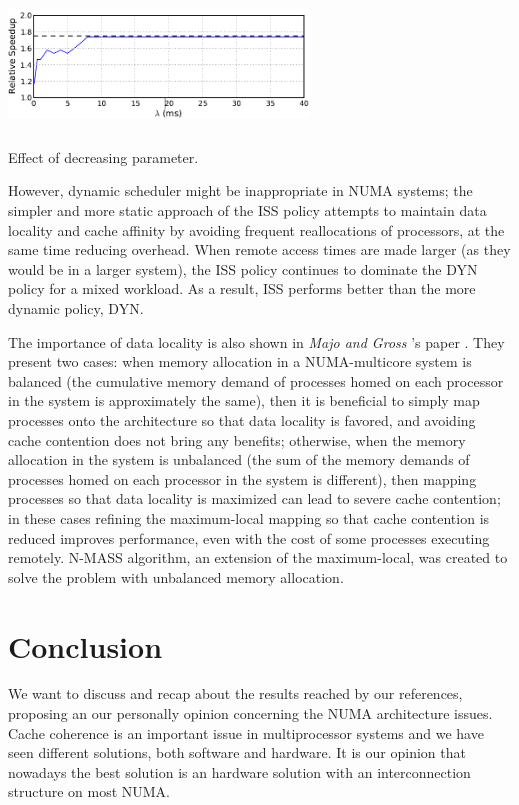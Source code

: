 \documentclass[a4paper,10pt]{article}
\makeatletter
\newenvironment{figurehere}{\def\@captype{figure}\vspace{2ex}}{\vspace{2ex}}
\makeatother
\begin{document}
\begin{multicols}{2}
\begin{figurehere}
 \centering
 \includegraphics[width=8cm, height=3.5cm]{./eps/juggle.png}
 \caption{Effect of decreasing parameter.}
 \label{fig:juggle}
\end{figurehere}

However, dynamic scheduler might be inappropriate in NUMA systems; the simpler and more static approach of the ISS policy attempts to maintain data locality and cache affinity by avoiding frequent reallocations of processors, at the same time reducing overhead. When remote access times are made larger (as they would be in a larger system), the ISS policy continues to dominate the DYN policy for a mixed workload. As a result, ISS performs better than the more dynamic policy, DYN.

The importance of data locality is also shown in \emph{Majo and Gross} 's paper \cite{Majo_memorymanagement}. They present two cases: when memory allocation in a NUMA-multicore system is balanced (the cumulative memory demand of processes homed on each processor in the system is approximately the same), then it is beneficial to simply map processes onto the architecture so that data locality is favored, and avoiding cache contention does not bring any benefits; otherwise, when the memory allocation in the system is unbalanced (the sum of the memory demands of processes homed on each processor in the system is different), then mapping processes so that data locality is maximized can lead to severe cache contention; in these cases refining the maximum-local mapping so that cache contention is reduced improves performance, even with the cost of some processes executing remotely. N-MASS algorithm, an extension of the maximum-local, was created to solve the problem with unbalanced memory allocation.



\section{Conclusion}
We want to discuss and recap about the results reached by our references, proposing an our personally opinion concerning the NUMA architecture issues.
Cache coherence is an important issue in multiprocessor systems and we have seen different solutions, both software and hardware. It is our opinion that nowadays the best solution is an hardware solution with an interconnection structure on most NUMA.


\end{multicols}
\end{document}
